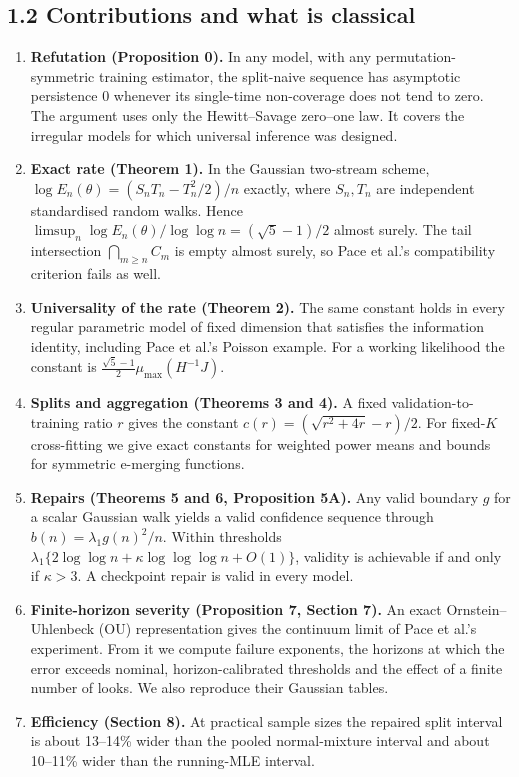 \documentclass[
  10pt,
  a4paper,
]{article}
\providecommand{\tightlist}{%
  \setlength{\itemsep}{0pt}\setlength{\parskip}{0pt}}
\begin{document}
\subsection{1.2 Contributions and what is
classical}\label{contributions-and-what-is-classical}

\begin{enumerate}
\def\labelenumi{\arabic{enumi}.}
\tightlist
\item
  \textbf{Refutation (Proposition 0).} In any model, with any
  permutation-symmetric training estimator, the split-naive sequence has
  asymptotic persistence \(0\) whenever its single-time non-coverage
  does not tend to zero. The argument uses only the Hewitt--Savage
  zero--one law. It covers the irregular models for which universal
  inference was designed.
\item
  \textbf{Exact rate (Theorem 1).} In the Gaussian two-stream scheme,
  \(\log E_n(\theta)=(S_nT_n-T_n^2/2)/n\) exactly, where \(S_n,T_n\) are
  independent standardised random walks. Hence
  \(\limsup_n\log E_n(\theta)/\log\log n=(\sqrt5-1)/2\) almost surely.
  The tail intersection \(\bigcap_{m\ge n}C_m\) is empty almost surely,
  so Pace et al.'s compatibility criterion fails as well.
\item
  \textbf{Universality of the rate (Theorem 2).} The same constant holds
  in every regular parametric model of fixed dimension that satisfies
  the information identity, including Pace et al.'s Poisson example. For
  a working likelihood the constant is
  \(\tfrac{\sqrt5-1}{2}\mu_{\max}(H^{-1}J)\).
\item
  \textbf{Splits and aggregation (Theorems 3 and 4).} A fixed
  validation-to-training ratio \(r\) gives the constant
  \(c(r)=(\sqrt{r^2+4r}-r)/2\). For fixed-\(K\) cross-fitting we give
  exact constants for weighted power means and bounds for symmetric
  e-merging functions.
\item
  \textbf{Repairs (Theorems 5 and 6, Proposition 5A).} Any valid
  boundary \(g\) for a scalar Gaussian walk yields a valid confidence
  sequence through \(b(n)=\lambda_1g(n)^2/n\). Within thresholds
  \(\lambda_1\{2\log\log n+\kappa\log\log\log n+O(1)\}\), validity is
  achievable if and only if \(\kappa>3\). A checkpoint repair is valid
  in every model.
\item
  \textbf{Finite-horizon severity (Proposition 7, Section 7).} An exact
  Ornstein--Uhlenbeck (OU) representation gives the continuum limit of
  Pace et al.'s experiment. From it we compute failure exponents, the
  horizons at which the error exceeds nominal, horizon-calibrated
  thresholds and the effect of a finite number of looks. We also
  reproduce their Gaussian tables.
\item
  \textbf{Efficiency (Section 8).} At practical sample sizes the
  repaired split interval is about 13--14\% wider than the pooled
  normal-mixture interval and about 10--11\% wider than the running-MLE
  interval.
\end{enumerate}
\end{document}
